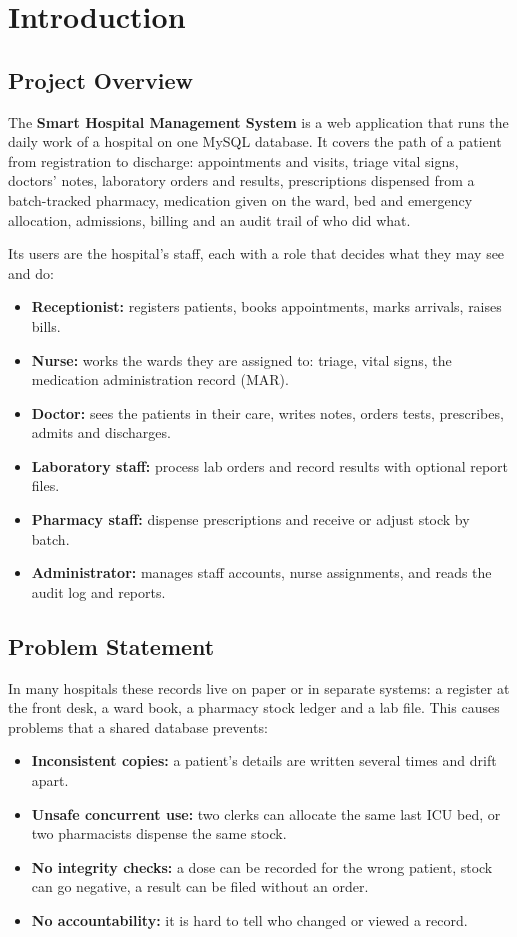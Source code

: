 \chapter{Introduction}

\section{Project Overview}
The \textbf{Smart Hospital Management System} is a web application that runs the daily work of a hospital
on one MySQL database. It covers the path of a patient from registration to discharge: appointments and
visits, triage vital signs, doctors' notes, laboratory orders and results, prescriptions dispensed from a
batch-tracked pharmacy, medication given on the ward, bed and emergency allocation, admissions, billing and
an audit trail of who did what.

Its users are the hospital's staff, each with a role that decides what they may see and do:
\begin{itemize}
\item \textbf{Receptionist:} registers patients, books appointments, marks arrivals, raises bills.
\item \textbf{Nurse:} works the wards they are assigned to: triage, vital signs, the medication administration record (MAR).
\item \textbf{Doctor:} sees the patients in their care, writes notes, orders tests, prescribes, admits and discharges.
\item \textbf{Laboratory staff:} process lab orders and record results with optional report files.
\item \textbf{Pharmacy staff:} dispense prescriptions and receive or adjust stock by batch.
\item \textbf{Administrator:} manages staff accounts, nurse assignments, and reads the audit log and reports.
\end{itemize}

\section{Problem Statement}
In many hospitals these records live on paper or in separate systems: a register at the front desk, a ward
book, a pharmacy stock ledger and a lab file. This causes problems that a shared database prevents:
\begin{itemize}
\item \textbf{Inconsistent copies:} a patient's details are written several times and drift apart.
\item \textbf{Unsafe concurrent use:} two clerks can allocate the same last ICU bed, or two pharmacists dispense the same stock.
\item \textbf{No integrity checks:} a dose can be recorded for the wrong patient, stock can go negative, a result can be filed without an order.
\item \textbf{No accountability:} it is hard to tell who changed or viewed a record.
\end{itemize}

